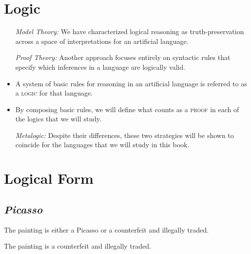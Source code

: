\documentclass[a4paper, 11pt]{article} %
\begin{document}
\section*{Logic}

\begin{itemize}[leftmargin=1in,labelsep=.15in]
  \item[\it Model Theory:] We have characterized logical reasoning as truth-preservation across a space of interpretations for an artificial language.
  \item[\it Proof Theory:] Another approach focuses entirely on syntactic rules that specify which inferences in a language are logically valid. %
    \item A system of basic rules for reasoning in an artificial language is referred to as a \textsc{logic} for that language.
    \item By composing basic rules, we will define what counts as a \textsc{proof} in each of the logics that we will study.
  \item[\it Metalogic:] Despite their differences, these two strategies will be shown to coincide for the languages that we will study in this book.
\end{itemize}



\section*{Logical Form}

\subsection*{\it \textbf{Picasso}}

\begin{earg}
  \item The painting is either a Picasso or a counterfeit and illegally traded.
  \item The painting is a counterfeit and illegally traded.
\end{earg}

\end{document}

